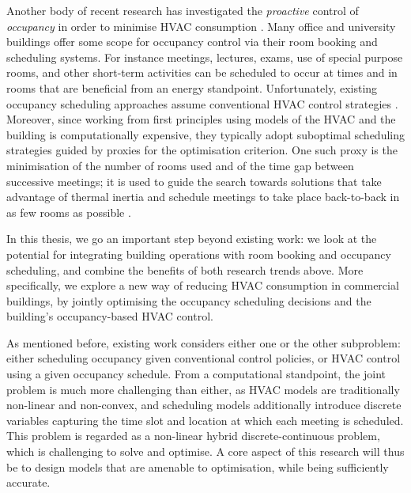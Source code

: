 Another body of recent research has investigated the {\em proactive} control of {\em occupancy} in order to minimise HVAC consumption \citep{chai2014minimizing,klein2012coordinating,kwak2013tesla,majumdar2012energy,pan2012thermal}. Many office and university buildings offer some scope for occupancy control via their room booking and scheduling systems. For instance meetings, lectures, exams, use of special purpose rooms, and other short-term activities can be scheduled to occur at times and in rooms that are beneficial from an energy standpoint.
Unfortunately, existing occupancy scheduling approaches assume conventional HVAC control strategies \citep{kwak2013tesla}. Moreover, since working from first principles using models of the HVAC and the building is computationally expensive, they typically adopt suboptimal scheduling strategies guided by proxies for the optimisation criterion. One such proxy is the minimisation of the number of rooms used and of the time gap between successive meetings; it is used to guide the search towards solutions that take advantage of thermal inertia and schedule meetings to take place back-to-back in as few rooms as possible \citep{pan2012thermal,majumdar2012energy}.

In this thesis, we go an important step beyond existing work: we look at the potential for integrating building operations with room booking and occupancy scheduling, and combine the benefits of both research trends above. 
More specifically, we explore a new way of reducing HVAC consumption in commercial buildings, by jointly optimising the occupancy scheduling decisions and the building's occupancy-based HVAC control. %

As mentioned before, existing work considers either one or the other subproblem: either scheduling occupancy given conventional control policies, or HVAC control using a given occupancy schedule. 
From a computational standpoint, the joint problem is much more challenging than either, as HVAC models are traditionally non-linear and non-convex, and scheduling models additionally introduce discrete variables capturing the time slot and location at which each meeting is scheduled. This problem is regarded as a non-linear hybrid discrete-continuous problem, which is challenging to solve and optimise. A core aspect of this research will thus be to design models that are amenable to optimisation, while being sufficiently accurate. 

